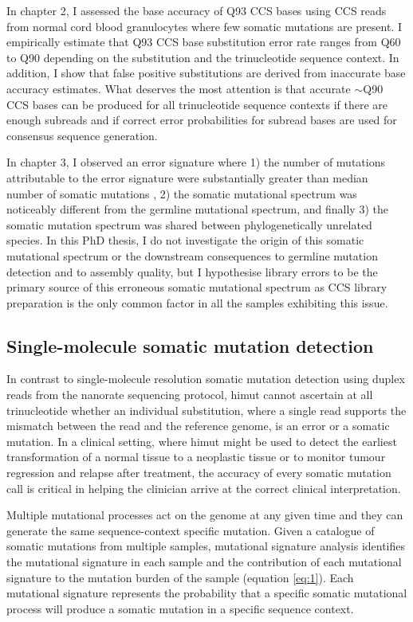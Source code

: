 In chapter 2, I assessed the base accuracy of Q93 CCS bases using CCS reads from normal cord blood granulocytes where few somatic mutations are present. I empirically estimate that Q93 CCS base substitution error rate ranges from Q60 to Q90 depending on the substitution and the trinucleotide sequence context. In addition, I show that false positive substitutions are derived from inaccurate base accuracy estimates. What deserves the most attention is that accurate $\sim$Q90 CCS bases can be produced for all trinucleotide sequence contexts if there are enough subreads and if correct error probabilities for subread bases are used for consensus sequence generation. 

In chapter 3, I observed an error signature where 1) the number of mutations attributable to the error signature were substantially greater than median number of somatic mutations , 2) the somatic mutational spectrum was noticeably different from the germline mutational spectrum, and finally 3) the somatic mutation spectrum was shared between phylogenetically unrelated species. In this PhD thesis, I do not investigate the origin of this somatic mutational spectrum or the downstream consequences to germline mutation detection and to assembly quality, but I hypothesise library errors to be the primary source of this erroneous somatic mutational spectrum as CCS library preparation is the only common factor in all the samples exhibiting this issue. 

\subsection{Single-molecule somatic mutation detection}

In contrast to single-molecule resolution somatic mutation detection using duplex reads from the nanorate sequencing protocol, himut cannot ascertain at all trinucleotide whether an individual substitution, where a single read supports the mismatch between the read and the reference genome, is an error or a somatic mutation. In a clinical setting, where himut might be used to detect the earliest transformation of a normal tissue to a neoplastic tissue or to monitor tumour regression and relapse after treatment, the accuracy of every somatic mutation call is critical in helping the clinician arrive at the correct clinical interpretation. 
 
Multiple mutational processes act on the genome at any given time and they can generate the same sequence-context specific mutation. Given a catalogue of somatic mutations from multiple samples, mutational signature analysis identifies the mutational signature in each sample and the contribution of each mutational signature to the mutation burden of the sample (equation \ref{eq:1}). Each mutational signature represents the probability that a specific somatic mutational process will produce a somatic mutation in a specific sequence context. 

